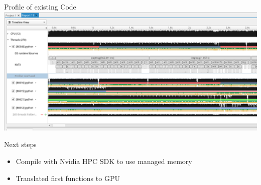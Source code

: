 \documentclass{beamer}
\begin{document}
\begin{frame}{Profile of existing Code}
\includegraphics[width=\framewidth]{HackathonSlides/Pictures/profile_timeline_cpu.png}
\end{frame}

\begin{frame}{Next steps}
\begin{itemize}
\item Compile with Nvidia HPC SDK to use managed memory
\item Translated first functions to GPU
\end{itemize}
\end{frame}
\end{document}
